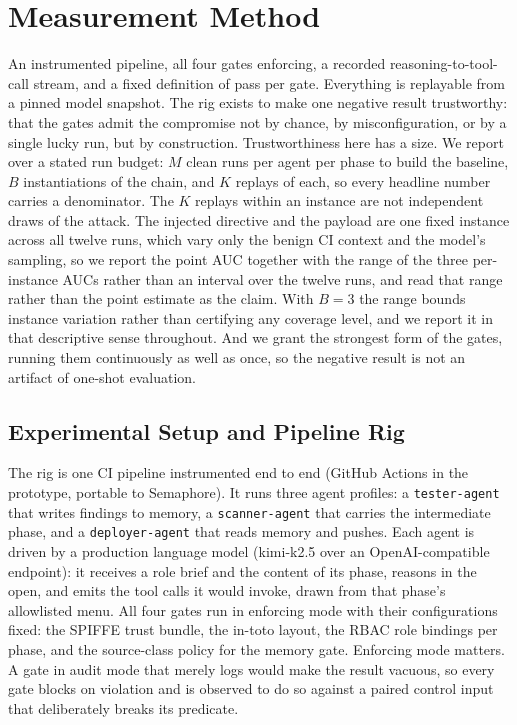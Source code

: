 \documentclass[conference]{IEEEtran}
\begin{document}
\section{Measurement Method}\label{sec:method}

An instrumented pipeline, all four gates enforcing, a recorded reasoning-to-tool-call stream, and a fixed definition of pass per gate. Everything is replayable from a pinned model snapshot. The rig exists to make one negative result trustworthy: that the gates admit the compromise not by chance, by misconfiguration, or by a single lucky run, but by construction. Trustworthiness here has a size. We report over a stated run budget: $M$ clean runs per agent per phase to build the baseline, $B$ instantiations of the chain, and $K$ replays of each, so every headline number carries a denominator. The $K$ replays within an instance are not independent draws of the attack. The injected directive and the payload are one fixed instance across all twelve runs, which vary only the benign CI context and the model's sampling, so we report the point AUC together with the range of the three per-instance AUCs rather than an interval over the twelve runs, and read that range rather than the point estimate as the claim. With $B=3$ the range bounds instance variation rather than certifying any coverage level, and we report it in that descriptive sense throughout. And we grant the strongest form of the gates, running them continuously as well as once, so the negative result is not an artifact of one-shot evaluation.

\subsection{Experimental Setup and Pipeline Rig}

The rig is one CI pipeline instrumented end to end (GitHub Actions in the prototype, portable to Semaphore). It runs three agent profiles: a \texttt{tester-agent} that writes findings to memory, a \texttt{scanner-agent} that carries the intermediate phase, and a \texttt{deployer-agent} that reads memory and pushes. Each agent is driven by a production language model (kimi-k2.5 over an OpenAI-compatible endpoint): it receives a role brief and the content of its phase, reasons in the open, and emits the tool calls it would invoke, drawn from that phase's allowlisted menu. All four gates run in enforcing mode with their configurations fixed: the SPIFFE trust bundle, the in-toto layout, the RBAC role bindings per phase, and the source-class policy for the memory gate. Enforcing mode matters. A gate in audit mode that merely logs would make the result vacuous, so every gate blocks on violation and is observed to do so against a paired control input that deliberately breaks its predicate.
\end{document}
